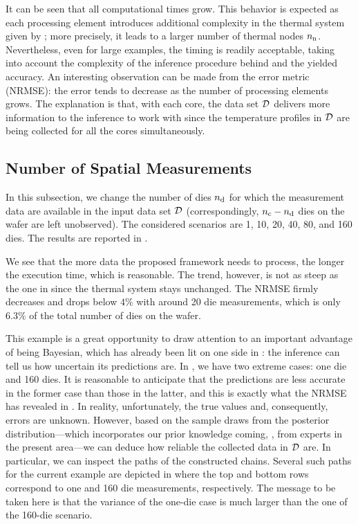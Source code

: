 It can be seen that all computational times grow. This behavior is expected as each processing element introduces additional complexity in the thermal system given by ; more precisely, it leads to a larger number of thermal nodes ${n_\text{n}}$. Nevertheless, even for large examples, the timing is readily acceptable, taking into account the complexity of the inference procedure behind and the yielded accuracy.
An interesting observation can be made from the error metric (NRMSE): the error tends to decrease as the number of processing elements grows. The explanation is that, with each core, the data set $\mathcal{D}$ delivers more information to the inference to work with since the temperature profiles in $\mathcal{D}$ are being collected for all the cores simultaneously.

\subsection{Number of Spatial Measurements}

In this subsection, we change the number of dies ${n_{\text{d}}}$ for which the measurement data are available in the input data set $\mathcal{D}$ (correspondingly, ${n_{\text{c}}} - {n_{\text{d}}}$ dies on the wafer are left unobserved). The considered scenarios are 1, 10, 20, 40, 80, and 160 dies. The results are reported in .


We see that the more data the proposed framework needs to process, the longer the execution time, which is reasonable. The trend, however, is not as steep as the one in  since the thermal system stays unchanged.
The NRMSE firmly decreases and drops below $4\%$ with around 20 die measurements, which is only $6.3\%$ of the total number of dies on the wafer.

This example is a great opportunity to draw attention to an important advantage of being Bayesian, which has already been lit on one side in : the inference can tell us how uncertain its predictions are. In , we have two extreme cases: one die and 160 dies. It is reasonable to anticipate that the predictions are less accurate in the former case than those in the latter, and this is exactly what the NRMSE has revealed in . In reality, unfortunately, the true values and, consequently, errors are unknown. However, based on the sample draws from the posterior distribution---which incorporates our prior knowledge coming, \eg, from experts in the present area---we can deduce how reliable the collected data in $\mathcal{D}$ are. In particular, we can inspect the paths of the constructed chains. Several such paths for the current example are depicted in  where the top and bottom rows correspond to one and 160 die measurements, respectively. The message to be taken here is that the variance of the one-die case is much larger than the one of the 160-die scenario.

